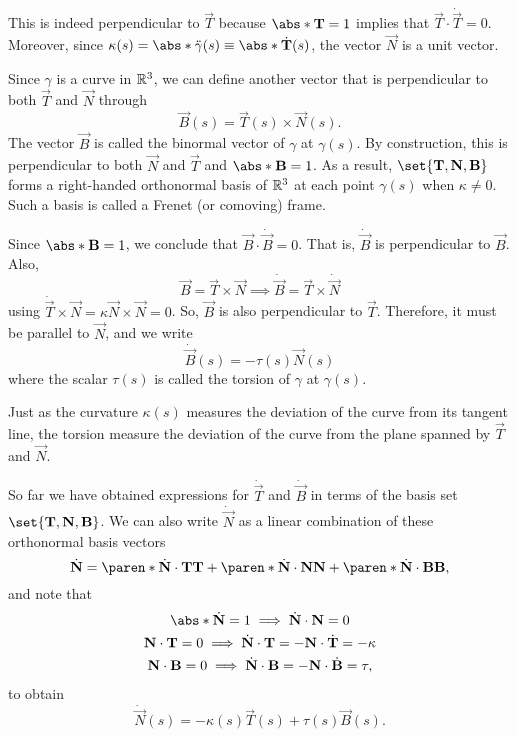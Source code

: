 \documentclass[11pt]{penrose}
\newcommand{\vT}{\vec{T}}
\newcommand{\vN}{\vec{N}}
\newcommand{\vB}{\vec{B}}
\newcommand{\keyword}[1]{\textsf{#1}}
\begin{document}
This is indeed perpendicular to $\vT$ because $\abs*{\vT} = 1$ implies that $\vT \cdot \dot{\vT} = 0$. Moreover, since $\kappa(s) = \abs*{\ddot{\gamma}(s)} \equiv \abs*{\dot{\vT}(s)}$, the vector $\vN$ is a unit vector.

Since $\gamma$ is a curve in $\mathbb{R}^3$, we can define another vector that is perpendicular to both $\vT$ and $\vN$ through
\begin{equation}
    \vB(s) = \vT(s) \times \vN(s).
    \label{eq:bivector-dfn}
\end{equation}
The vector $\vB$ is called the \keyword{binormal} vector of $\gamma$ at $\gamma(s)$. By construction, this is perpendicular to both $\vN$ and $\vT$ and $\abs*{\vB} = 1$. As a result, $\set{\vT, \vN, \vB}$ forms a right-handed orthonormal basis of $\mathbb{R}^3$ at each point $\gamma(s)$ when $\kappa \neq 0$. Such a basis is called a Frenet (or comoving) frame.

Since $\abs*{\vB} = 1$, we conclude that $\vB \cdot \dot{\vB} = 0$. That is, $\dot{\vB}$ is perpendicular to $\vB$. Also,
\begin{equation}
    \vB = \vT \times \vN
    \implies
    \dot{\vB} = \vT \times \dot{\vN}
\end{equation}
using $\dot{\vT} \times \vN = \kappa \vN \times \vN = 0$. So, $\vB$ is also perpendicular to $\vT$. Therefore, it must be parallel to $\vN$, and we write
\begin{equation}
    \dot{\vB}(s) = - \tau(s) \vN(s)
\end{equation}
where the scalar $\tau(s)$ is called the torsion of $\gamma$ at $\gamma(s)$.

Just as the curvature $\kappa(s)$ measures the deviation of the curve from its tangent line, the torsion measure the deviation of the curve from the plane spanned by $\vT$ and $\vN$.

So far we have obtained expressions for $\dot{\vT}$ and $\dot{\vB}$ in terms of the basis set $\set{\vT, \vN, \vB}$. We can also write $\dot{\vN}$ as a linear combination of these orthonormal basis vectors
\begin{equation}
    \dot{\vN} = \paren*{\dot{\vN}\cdot\vT} \vT + \paren*{\dot{\vN}\cdot\vN} \vN + \paren*{\dot{\vN}\cdot\vB} \vB,
\end{equation}
and note that
\begin{gather}
    \abs*{\dot{\vN}} = 1 \implies \dot{\vN}\cdot\vN = 0\\
    \vN \cdot \vT = 0 \implies \dot{\vN}\cdot\vT = -\vN \cdot \dot{\vT} = -\kappa\\
    \vN \cdot \vB = 0 \implies \dot{\vN}\cdot\vB = -\vN \cdot \dot{\vB} = \tau,
\end{gather}
to obtain
\begin{equation}
    \dot{\vN}(s) = -\kappa(s) \vT(s) + \tau(s) \vB(s).
\end{equation}
\end{document}

